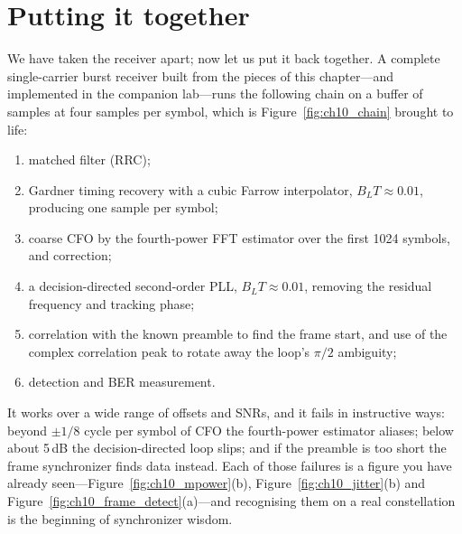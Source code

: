 \section{Putting it together}
\label{sec:ch10:together}

We have taken the receiver apart; now let us put it back together. A complete single-carrier burst
receiver built from the pieces of this chapter---and implemented in the companion lab---runs the
following chain on a buffer of samples at four samples per symbol, which is
Figure~\ref{fig:ch10_chain} brought to life:
\begin{enumerate}
\item matched filter (RRC);
\item Gardner timing recovery with a cubic Farrow interpolator, $B_LT\approx0.01$, producing one sample
per symbol;
\item coarse CFO by the fourth-power FFT estimator over the first 1024 symbols, and correction;
\item a decision-directed second-order PLL, $B_LT\approx0.01$, removing the residual frequency and
tracking phase;
\item correlation with the known preamble to find the frame start, and use of the complex correlation
peak to rotate away the loop's $\pi/2$ ambiguity;
\item detection and BER measurement.
\end{enumerate}

It works over a wide range of offsets and SNRs, and it fails in instructive ways: beyond $\pm1/8$ cycle
per symbol of CFO the fourth-power estimator aliases; below about 5\,dB the decision-directed loop
slips; and if the preamble is too short the frame synchronizer finds data instead. Each of those
failures is a figure you have already seen---Figure~\ref{fig:ch10_mpower}(b),
Figure~\ref{fig:ch10_jitter}(b) and Figure~\ref{fig:ch10_frame_detect}(a)---and recognising them on a
real constellation is the beginning of synchronizer wisdom.

